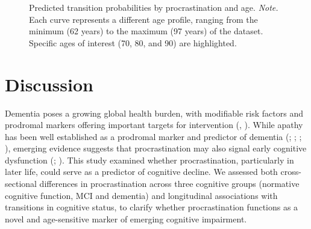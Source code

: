 \documentclass[
]{article}
\begin{document}
\begin{figure}


\caption{\label{fig-age-preds}Predicted transition probabilities by
procrastination and age. \emph{Note.} Each curve represents a different
age profile, ranging from the minimum (62 years) to the maximum (97
years) of the dataset. Specific ages of interest (70, 80, and 90) are
highlighted.}

\end{figure}%

\section{Discussion}\label{discussion}

Dementia poses a growing global health burden, with modifiable risk
factors and prodromal markers offering important targets for
intervention (,
). While apathy has been well
established as a prodromal marker and predictor of dementia
(;
;
;
), emerging evidence
suggests that procrastination may also signal early cognitive
dysfunction (;
). This study examined
whether procrastination, particularly in later life, could serve as a
predictor of cognitive decline. We assessed both cross-sectional
differences in procrastination across three cognitive groups (normative
cognitive function, MCI and dementia) and longitudinal associations with
transitions in cognitive status, to clarify whether procrastination
functions as a novel and age-sensitive marker of emerging cognitive
impairment.
\end{document}
